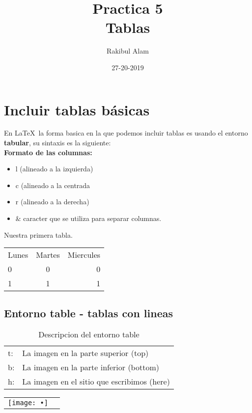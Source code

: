 \documentclass[12pt]{article}
\begin{document}
\title{Practica 5\\Tablas}
\author{Rakibul Alam}
\date{27-20-2019}
\maketitle
\tableofcontents


\section{Incluir tablas básicas}
En \LaTeX \, la forma basica en la que podemos incluir tablas es usando el entorno \textbf{tabular}, su sintaxis es la siguiente:\\[0.3cm]
\noindent \textbf{Formato de las columnas:}
\begin{itemize}
\item l (alineado a la izquierda)
\item c (alineado a la centrada
\item r (alineado a la derecha)
\end{itemize}

\begin{itemize}
\item $\& $ caracter que se utiliza para separar columnas.
\end{itemize}

Nuestra primera tabla. \quad
\begin{tabular}{lcr}
Lunes & Martes & Miercules \\
0 	  &		 0 & 	0\\
1	  &     1  & 1  \\
\end{tabular}

\newpage

\subsection{Entorno table - tablas con lineas}

\begin{table}[!ht]
\centering

\begin{tabular}{ll}
t: & La imagen en la parte superior (top)\\
b: & La imagen en la parte inferior (bottom)\\
h: & La imagen en el sitio que escribimos (here)
\end{tabular}
\caption{Descripcion del entorno table}
\label{Tabla1}
\end{table}

\begin{table}[!ht]
\centering
\begin{tabular}{lc}
\texttt{[image: •]}
\end{tabular}
\end{table}
\end{document}
